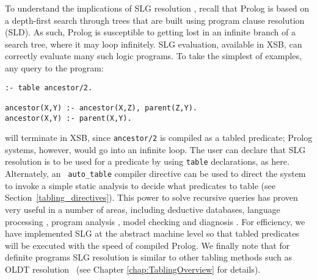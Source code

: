 To understand the implications of SLG resolution \cite{ChWa96}, recall
that Prolog is based on a depth-first search through trees that are
built using program clause resolution (SLD).  As such, Prolog is
susceptible to getting 
lost in an infinite branch of a search tree, where it may loop
infinitely.  SLG evaluation, available in XSB, can correctly evaluate
many such logic programs.  To take the simplest of examples, any query
to the program:
\begin{center}
\begin{minipage}{3.8in}
\begin{verbatim}
:- table ancestor/2.

ancestor(X,Y) :- ancestor(X,Z), parent(Z,Y).
ancestor(X,Y) :- parent(X,Y).
\end{verbatim}
\end{minipage}
\end{center}
will terminate in XSB, since {\tt ancestor/2} is compiled as a tabled
predicate; Prolog systems, however, would go into an infinite loop.
The user can declare that SLG resolution is to be used for a predicate
by using {\tt table} declarations, as here.  Alternately, an {\tt
auto\_table} compiler directive can be used to direct the system to
invoke a simple static analysis to decide what predicates to table
(see Section~\ref{tabling_directives}).  This power to solve recursive
queries has proven very useful in a number of areas, including
deductive databases, language processing \cite{syntactica, semantica},
program analysis \cite{DRW96, CoDS96, Boul97}, model checking
\cite{RRRSSW97} and diagnosis \cite{GSTPD00}.  For efficiency, we
have implemented SLG at the abstract machine level so that tabled
predicates will be executed with the speed of compiled Prolog.  We
finally note that for definite programs SLG resolution is similar to
other tabling methods such as OLDT resolution~\cite{TaSa86} (see
Chapter
\ref{chap:TablingOverview} for details).

